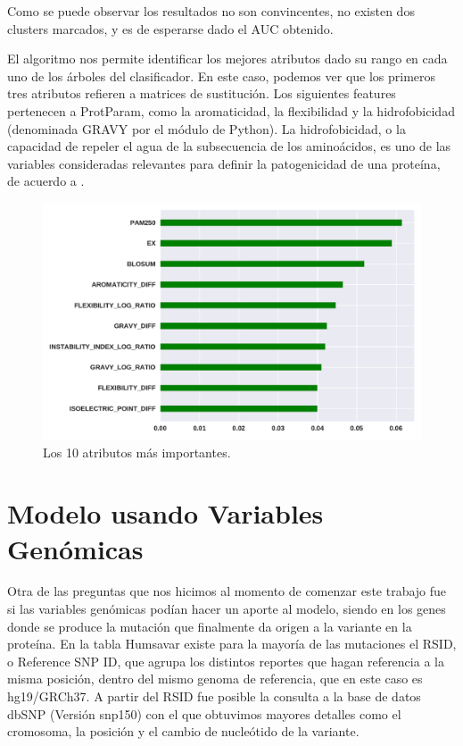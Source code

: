 
Como se puede observar los resultados no son convincentes, no existen dos clusters marcados, y es de esperarse dado el AUC obtenido.


El algoritmo nos permite identificar los mejores atributos dado su rango en cada uno de los árboles del clasificador. En este caso, podemos ver que los primeros tres atributos refieren a matrices de sustitución. Los siguientes features pertenecen a ProtParam, como la aromaticidad, la flexibilidad y la hidrofobicidad (denominada GRAVY por el módulo de Python). La hidrofobicidad, o la capacidad de repeler el agua de la subsecuencia de los aminoácidos, es uno de las variables consideradas relevantes para definir la patogenicidad de una proteína, de acuerdo a \cite{Wang2016}.

\begin{figure}[H]
    \centering
    \includegraphics[scale=0.73]{documents/latex/figures/3/importance_1.pdf}
    \caption{Los 10 atributos más importantes.}
    \label{fig:importance_1}
\end{figure}

\section{Modelo usando Variables Genómicas}

Otra de las preguntas que nos hicimos al momento de comenzar este trabajo fue si las variables genómicas podían hacer un aporte al modelo, siendo en los genes donde se produce la mutación que finalmente da origen a la variante en la proteína. En la tabla Humsavar existe para la mayoría de las mutaciones el RSID, o Reference SNP ID, que agrupa los distintos reportes que hagan referencia a la misma posición, dentro del mismo genoma de referencia, que en este caso es hg19/GRCh37. A partir del RSID fue posible la consulta a la base de datos dbSNP (Versión snp150) con el que obtuvimos mayores detalles como el cromosoma, la posición y el cambio de nucleótido de la variante. 

